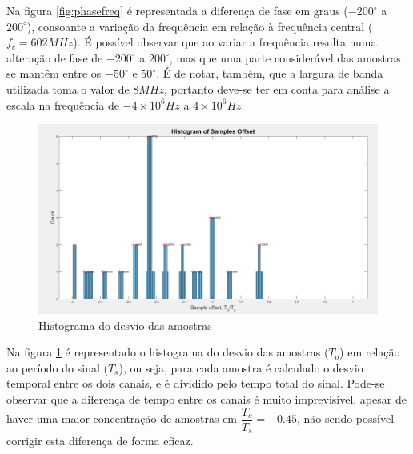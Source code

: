 Na figura \ref{fig:phasefreq} é representada a diferença de fase em graus ($-200^{\circ}$ a $200^{\circ}$), consoante a variação da frequência em relação à frequência central ($f_{c}=602 MHz$). É possível observar que ao variar a frequência resulta numa alteração de fase de $-200^{\circ}$ a $200^{\circ}$, mas que uma parte considerável das amostras se mantêm entre os $-50^{\circ}$ e $50^{\circ}$. É de notar, também, que a largura de banda utilizada toma o valor de $8 MHz$, portanto deve-se ter em conta para análise a escala na frequência de $-4\times 10^{6} Hz$ a $4\times 10^{6} Hz$.


\begin{figure}[h]
\centering
\includegraphics[scale=0.35]{chapters/ch5/assets/histogram}
\caption[Desvio das amostras]{Histograma do desvio das amostras}
\label{fig:histogram}
\end{figure}


Na figura \ref{fig:histogram} é representado o histograma do desvio das amostras ($T_{o}$) em relação ao período do sinal ($T_{s}$), ou seja, para cada amostra é calculado o desvio temporal entre os dois canais, e é dividido pelo tempo total do sinal. Pode-se observar que a diferença de tempo entre os canais é muito imprevisível, apesar de haver uma maior concentração de amostras em $\dfrac{T_{o}}{T_{s}}=-0.45$, não sendo possível corrigir esta diferença de forma eficaz.


